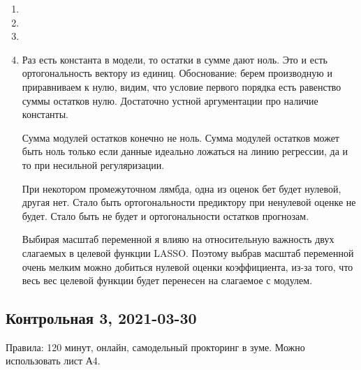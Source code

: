\begin{enumerate}
    \item 
    \item 
    \item 
    \item Раз есть константа в модели, то остатки в сумме дают ноль. Это и есть ортогональность вектору из единиц. 
    Обоснование: берем производную и приравниваем к нулю, видим, что условие первого порядка есть равенство суммы остатков нулю. 
    Достаточно устной аргументации про наличие константы.

    
    Сумма модулей остатков конечно не ноль. Сумма модулей остатков может быть ноль только если данные идеально ложаться на линию регрессии, 
    да и то при несильной регуляризации. 
    
    При некотором промежуточном лямбда, одна из оценок бет будет нулевой, другая нет. 
    Стало быть ортогональности предиктору при ненулевой оценке не будет. 
    Стало быть не будет и ортогональности остатков прогнозам. 

    Выбирая масштаб переменной я влияю на относительную важность двух слагаемых в целевой функции LASSO. 
    Поэтому выбрав масштаб переменной очень мелким можно добиться нулевой оценки коэффициента, 
    из-за того, что весь вес целевой функции будет перенесен на слагаемое с модулем.
\end{enumerate}


\subsection{Контрольная 3, 2021-03-30}

Правила: 120 минут, онлайн, самодельный прокторинг в зуме. Можно использовать лист А4.


